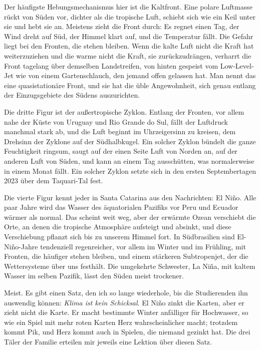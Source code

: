 \documentclass[
  ngerman,
  11pt,
  openany]{book}
\begin{document}
Der häufigste Hebungsmechanismus hier ist die Kaltfront. Eine polare
Luftmasse rückt von Süden vor, dichter als die tropische Luft, schiebt
sich wie ein Keil unter sie und hebt sie an. Meistens zieht die Front
durch: Es regnet einen Tag, der Wind dreht auf Süd, der Himmel klart
auf, und die Temperatur fällt. Die Gefahr liegt bei den Fronten, die
stehen bleiben. Wenn die kalte Luft nicht die Kraft hat weiterzuziehen
und die warme nicht die Kraft, sie zurückzudrängen, verharrt die Front
tagelang über demselben Landstreifen, von hinten gespeist vom
Low-Level-Jet wie von einem Gartenschlauch, den jemand offen gelassen
hat. Man nennt das eine quasistationäre Front, und sie hat die üble
Angewohnheit, sich genau entlang der Einzugsgebiete des Südens
auszurichten.

Die dritte Figur ist der außertropische Zyklon. Entlang der Fronten, vor
allem nahe der Küste von Uruguay und Rio Grande do Sul, fällt der
Luftdruck manchmal stark ab, und die Luft beginnt im Uhrzeigersinn zu
kreisen, dem Drehsinn der Zyklone auf der Südhalbkugel. Ein solcher
Zyklon bündelt die ganze Feuchtigkeit ringsum, saugt auf der einen Seite
Luft von Norden an, auf der anderen Luft von Süden, und kann an einem
Tag ausschütten, was normalerweise in einem Monat fällt. Ein solcher
Zyklon setzte sich in den ersten Septembertagen 2023 über dem
Taquari-Tal fest.

Die vierte Figur kennt jeder in Santa Catarina aus den Nachrichten: El
Niño. Alle paar Jahre wird das Wasser des äquatorialen Pazifiks vor Peru
und Ecuador wärmer als normal. Das scheint weit weg, aber der erwärmte
Ozean verschiebt die Orte, an denen die tropische Atmosphäre aufsteigt
und absinkt, und diese Verschiebung pflanzt sich bis zu unserem Himmel
fort. In Südbrasilien sind El-Niño-Jahre tendenziell regenreicher, vor
allem im Winter und im Frühling, mit Fronten, die häufiger stehen
bleiben, und einem stärkeren Subtropenjet, der die Wettersysteme über
uns festhält. Die umgekehrte Schwester, La Niña, mit kaltem Wasser im
selben Pazifik, lässt den Süden meist trockener.

Meist. Es gibt einen Satz, den ich so lange wiederhole, bis die
Studierenden ihn auswendig können: \emph{Klima ist kein Schicksal}. El
Niño zinkt die Karten, aber er zieht nicht die Karte. Er macht bestimmte
Winter anfälliger für Hochwasser, so wie ein Spiel mit mehr roten Karten
Herz wahrscheinlicher macht; trotzdem kommt Pik, und Herz kommt auch in
Spielen, die niemand gezinkt hat. Die drei Täler der Familie erteilen
mir jeweils eine Lektion über diesen Satz.
\end{document}
